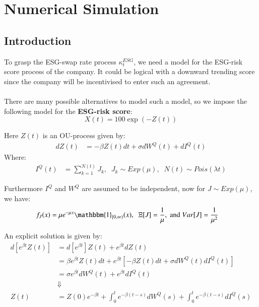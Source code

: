 \chapter{Numerical Simulation}
\label{chp_Num_sim}

\section{Introduction}
To grasp the ESG-swap rate process $\kappa_{t}^{ESG}$, we need a model for the ESG-risk score process of the company. It could be logical with a downward trending score since the company will be incentivised to enter such an agreement. 
\\~\\
There are many possible alternatives to model such a model, so we impose the following model for the \textbf{ESG-risk score}:
\[
X(t) = 100\exp(-Z(t))
\]

Here $Z(t)$ is an OU-process
given by: 
\begin{align*}
dZ(t) &= -\beta Z(t)dt + \sigma dW^{Q}(t) + dI^{Q}(t)    
\end{align*} 
Where: 
\begin{align*}
I^{Q}(t) &= \sum_{k=1}^{N(t)}J_{k}, \;\; J_{k}\sim Exp(\mu),\;\; N(t) \sim Pois(\lambda t)    
\end{align*} 

Furthermore $I^{Q}$ and $W^{Q}$ are assumed to be independent, now for $J\sim Exp(\mu)$, we have:
\begin{align*}
f_{J}(x) &= \mu e^{-\mu x}\mathbbm{1}_{[0,\infty)}(x), \;\; 
\E[J] = \frac{1}{\mu}, \;\text{and}\; Var[J] = \frac{1}{\mu^{2}}
\end{align*}

An explicit solution is given by: 
\begin{align}
\label{eq: characteristic_function_Z(t)}
d[e^{\beta t}Z(t)] &= d[e^{\beta t}]Z(t) + e^{\beta t}dZ(t) \nonumber \\ 
&= \beta e^{\beta t}Z(t)dt + e^{\beta t}[-\beta Z(t)dt + 
\sigma dW^{Q}(t) dI^{Q}(t)]
\nonumber \\ 
&=\sigma e^{\beta t}dW^{Q}(t) + e^{\beta t}dI^{Q}(t) \nonumber \\ 
&\Downarrow \nonumber\\ 
Z(t) &= Z(0)e^{-\beta t} +
\int_{0}^{t}e^{-\beta (t-s)}dW^{Q}(s) + 
\int_{0}^{t}e^{-\beta (t-s)}dI^{Q}(s)
\end{align} 



